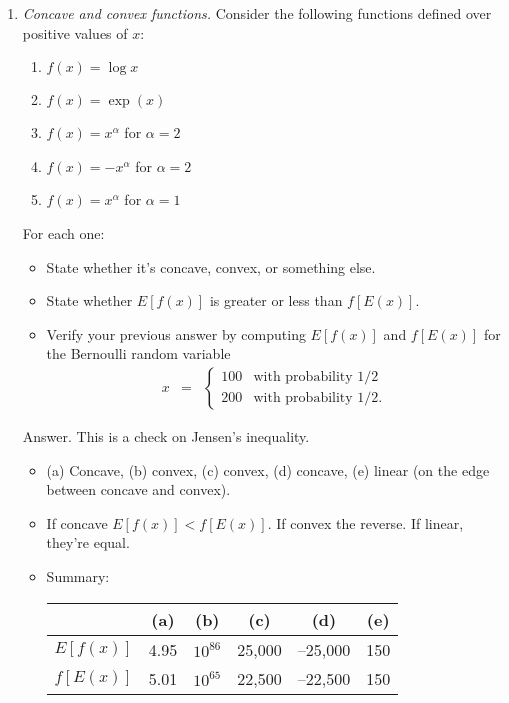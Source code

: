 \documentclass[11pt]{article}
\begin{document}
\begin{enumerate}
\item  {\it Concave and convex functions.\/}
Consider the following functions defined over positive values of $x$:
%
\begin{enumerate}
\item $f(x) = \log x$
\item $f(x) = \exp(x) $
\item $f(x) = x^{\alpha}$ for $\alpha = 2$
\item $f(x) = - x^{\alpha}$ for $\alpha = 2$
\item $f(x) = x^{\alpha} $ for $\alpha = 1$
\end{enumerate}
For each one:
\begin{itemize}
\item State whether it's concave, convex, or something else.
\item State whether $ E[f(x)]$ is greater or less than $f[E(x)]$.
\item Verify your previous answer by computing
 $ E[f(x)]$ and $f[E(x)]$
 for the Bernoulli random variable
\begin{eqnarray*}
    x &=& \left\{
            \begin{array}{ll}
            100   & \mbox{with probability } 1/2 \\
            200 & \mbox{with probability }   1/2 .
            \end{array}
            \right.
\end{eqnarray*}
\end{itemize}

Answer.
This is a check on Jensen's inequality.
\begin{itemize}
\item (a) Concave, (b) convex, (c) convex, (d) concave, (e) linear
(on the edge between concave and convex).
\item If concave $ E[f(x)] < f[E(x)]$.  If convex the reverse.
If linear, they're equal.
\item Summary: \\
\begin{center}
\begin{tabular}{lccccc}
\toprule
        & (a) & (b) & (c) & (d) & (e) \\
\midrule
$E[f(x)]$ & 4.95 & $10^{86}$ & 25,000 & --25,000 & 150 \\
$f[E(x)]$ & 5.01 & $10^{65}$ & 22,500 & --22,500 & 150 \\
\bottomrule
\end{tabular}
\end{center}
\end{itemize}
\bigskip


\end{enumerate}
\end{document}
